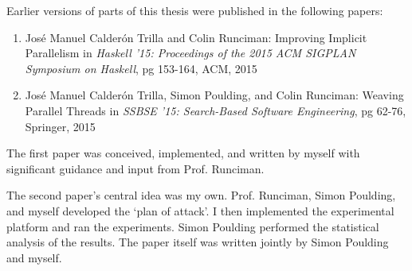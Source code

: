 Earlier versions of parts of this thesis were published in the
following papers:

\begin{enumerate}
    \item Jos\'{e} Manuel Calder\'{o}n Trilla and Colin Runciman: Improving
            Implicit Parallelism in \emph{Haskell '15: Proceedings of the
            2015 ACM SIGPLAN Symposium on Haskell}, pg 153-164, ACM, 2015
    \item Jos\'{e} Manuel Calder\'{o}n Trilla, Simon Poulding, and Colin
            Runciman: Weaving Parallel Threads in \emph{SSBSE '15: Search-Based
            Software Engineering}, pg 62-76, Springer, 2015
\end{enumerate}

The first paper was conceived, implemented, and written by myself with
significant guidance and input from Prof. Runciman.

The second paper's central idea was my own. Prof. Runciman, Simon Poulding, and
myself developed the `plan of attack'. I then implemented the experimental
platform and ran the experiments. Simon Poulding performed the statistical
analysis of the results. The paper itself was written jointly by Simon Poulding
and myself.
